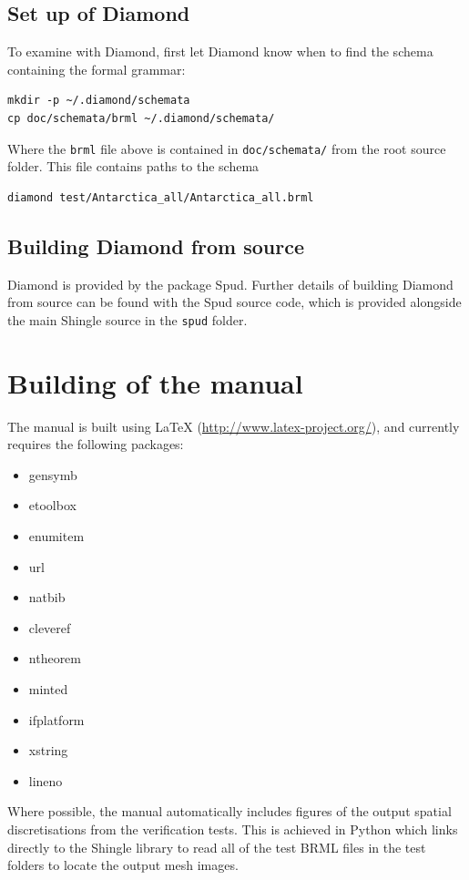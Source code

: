 \documentclass[a4paper, 10pt]{book}
\providecommand{\shingle}{Shingle\xspace}
\providecommand{\brml}{BRML\xspace}
\begin{document}
\subsection{Set up of Diamond}

\noindent
To examine with Diamond, first let Diamond know when to find the schema containing the formal grammar:
\begin{verbatim}
mkdir -p ~/.diamond/schemata
cp doc/schemata/brml ~/.diamond/schemata/ 
\end{verbatim}

\noindent
Where the \verb+brml+ file above is contained in \verb+doc/schemata/+ from the root source folder.  This file contains paths to the schema
\begin{verbatim}
diamond test/Antarctica_all/Antarctica_all.brml
\end{verbatim}

\subsection{Building Diamond from source}

\noindent
Diamond is provided by the package Spud.
Further details of building Diamond from source can be found with the Spud source code,
which is provided alongside the main \shingle source in the \verb+spud+ folder.



\section{Building of the manual}

\noindent
The manual is built using LaTeX (\url{http://www.latex-project.org/}), and currently requires the following packages:
\begin{itemize}
\item gensymb
\item etoolbox
\item enumitem
\item url
\item natbib
\item cleveref
\item ntheorem
\item minted
\item ifplatform
\item xstring
\item lineno
\end{itemize}

\noindent
Where possible, the manual automatically
includes figures of the output spatial discretisations from the verification tests.
This is achieved in Python which links directly to the \shingle library to read all of the test \brml files in the test folders to locate the output mesh images.
\end{document}
